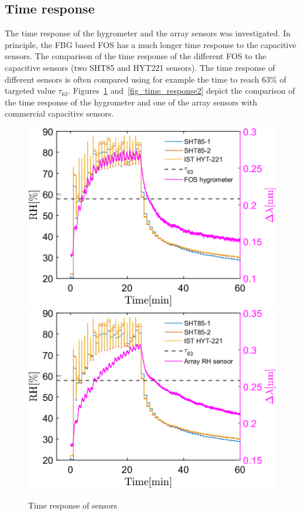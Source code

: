 \subsection{Time response}
The time response of the hygrometer and the array sensors was investigated. In principle, the \gls{FBG} based \gls{FOS} has a much longer time response to the capacitive sensors. The comparison of the time response of the different \gls{FOS} to the capacitive sensors (two SHT85 and HYT221 sensors). The time response of different sensors is often compared using for example the time to reach 63\% of targeted value $\tau_{63}$. Figures~\ref{fig_time_response} and~\ref{fig_time_response2} depict the comparison of the time response of the hygrometer and one of the array sensors with commercial capacitive sensors. 

\begin{figure}[!h]
\centering
\includegraphics[width=0.47\columnwidth]{Chapter5/images/20responseRH.png}
\includegraphics[width=0.47\columnwidth]{Chapter5/images/20responseRH2.png}
\caption{Time response of sensors}
\label{fig_time_response}
\end{figure}

